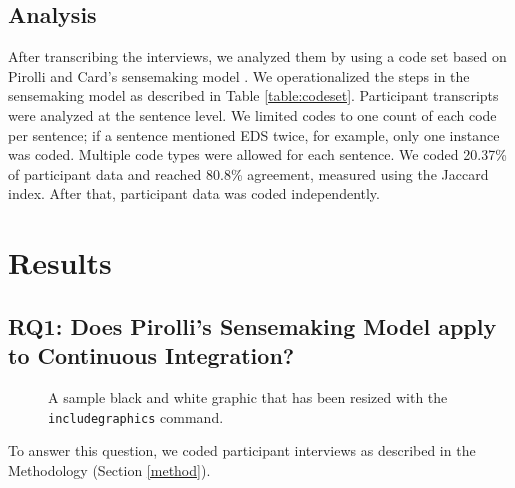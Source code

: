 \documentclass{sig-alternate}
\begin{document}
\subsection{Analysis}
After transcribing the interviews, we analyzed them by using a code set based on Pirolli and Card's sensemaking model \cite{pirolli:sensemaking}. We operationalized the steps in the sensemaking model as described in Table \ref{table:codeset}. Participant transcripts were analyzed at the sentence level. We limited codes to one count of each code per sentence; if a sentence mentioned EDS twice, for example, only one instance was coded. Multiple code types were allowed for each sentence. We coded 20.37\% of participant data and reached 80.8\% agreement, measured using the Jaccard index. After that, participant data was coded independently.

\section{Results}

\subsection{RQ1:  Does Pirolli's Sensemaking Model apply to Continuous Integration?}
\begin{figure}
\centering
{}
\caption{A sample black and white graphic
that has been resized with the \texttt{includegraphics} command.}
\end{figure}

To answer this question, we coded participant interviews as described in the Methodology (Section \ref{method}).
\end{document}
